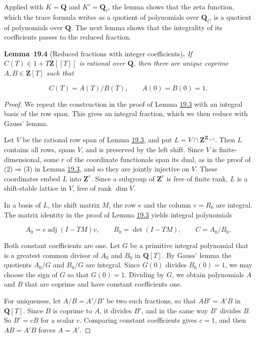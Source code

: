 \documentclass[11pt]{article}
\newenvironment{bpstatement}[2]{\par\addvspace{0.6\baselineskip}\noindent\textbf{#1}#2\textbf{.}\enspace\ignorespaces}
  {\par\addvspace{0.4\baselineskip}}
\newenvironment{bpstatementit}[2]{\begin{bpstatement}{#1}{#2}\itshape\ignorespaces}{\end{bpstatement}}
\begin{document}
\label{bp14}%
Applied with \(K=\mathbf Q\) and \(K'=\mathbf Q_\ell\), the lemma shows that the zeta function, which the trace formula writes as a quotient of polynomials over \(\mathbf Q_\ell\), is a quotient of polynomials over \(\mathbf Q\). The next lemma shows that the integrality of its coefficients passes to the reduced fraction.

\label{bp15}%
\begin{bpstatementit}{Lemma~19.4}{ (Reduced fractions with integer coefficients)}
If \(C(T)\in1+T\mathbf Z[[T]]\) is rational over \(\mathbf Q\), then there are unique coprime \(A,B\in\mathbf Z[T]\) such that

\[
C(T)=A(T)/B(T),\qquad A(0)=B(0)=1.
\]
\end{bpstatementit}

\begin{proof}[{Proof}]\label{bp16}%
We repeat the construction in the proof of Lemma \hyperref[bp12]{19.3} with an integral basis of the row span. This gives an integral fraction, which we then reduce with Gauss' lemma.

Let \(V\) be the rational row span of Lemma \hyperref[bp12]{19.3}, and put \(L=V\cap\mathbf Z^{\mathbf Z_{\geq0}}\). Then \(L\) contains all rows, spans \(V\), and is preserved by the left shift. Since \(V\) is finite-dimensional, some \(r\) of the coordinate functionals span its dual, as in the proof of (2)\(\Rightarrow\)(3) in Lemma \hyperref[bp12]{19.3}, and so they are jointly injective on \(V\). These coordinates embed \(L\) into \(\mathbf Z^r\). Since a subgroup of \(\mathbf Z^r\) is free of finite rank, \(L\) is a shift-stable lattice in \(V\), free of rank \(\dim V\).

In a basis of \(L\), the shift matrix \(M\), the row \(e\) and the column \(v=R_0\) are integral. The matrix identity in the proof of Lemma \hyperref[bp12]{19.3} yields integral polynomials

\[
A_0=e\operatorname{adj}(I-TM)v,\qquad B_0=\det(I-TM),
\qquad C=A_0/B_0.
\]

Both constant coefficients are one. Let \(G\) be a primitive integral polynomial that is a greatest common divisor of \(A_0\) and \(B_0\) in \(\mathbf Q[T]\). By Gauss' lemma the quotients \(A_0/G\) and \(B_0/G\) are integral. Since \(G(0)\) divides \(B_0(0)=1\), we may choose the sign of \(G\) so that \(G(0)=1\). Dividing by \(G\), we obtain polynomials \(A\) and \(B\) that are coprime and have constant coefficients one.

For uniqueness, let \(A/B=A'/B'\) be two such fractions, so that \(AB'=A'B\) in \(\mathbf Q[T]\). Since \(B\) is coprime to \(A\), it divides \(B'\), and in the same way \(B'\) divides \(B\). So \(B'=cB\) for a scalar \(c\). Comparing constant coefficients gives \(c=1\), and then \(AB=A'B\) forces \(A=A'\).
\end{proof}
\end{document}
